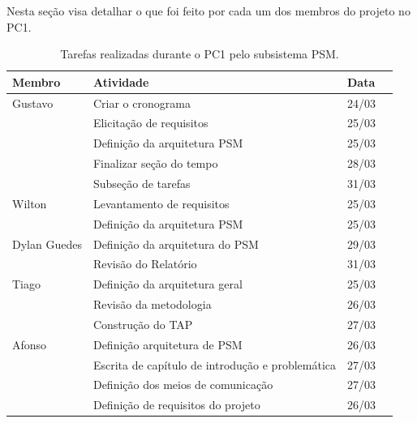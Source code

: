 Nesta seção visa detalhar o que foi feito por cada um dos membros do projeto no PC1.

\begin{table}[h]
  \begin{center}
  \caption{\label{tarefas}Tarefas realizadas durante o PC1 pelo subsistema PSM.}
  \begin{tabular}{|l|l|l|l|}
  \hline
  \textbf{Membro} & \textbf{Atividade} & \textbf{Data} \\ \hline\hline
  Gustavo & Criar o cronograma & 24/03 \\ \hline
   & Elicitação de requisitos & 25/03 \\ \hline
   & Definição da arquitetura PSM & 25/03 \\ \hline
   & Finalizar seção do tempo & 28/03 \\ \hline
   & Subseção de tarefas & 31/03\\ \hline
  Wilton & Levantamento de requisitos & 25/03 \\ \hline
   & Definição da arquitetura PSM & 25/03 \\ \hline
  Dylan Guedes & Definição da arquitetura do PSM & 29/03\\ \hline
   & Revisão do Relatório & 31/03 \\ \hline
  Tiago & Definição da arquitetura geral & 25/03 \\ \hline
   & Revisão da metodologia & 26/03 \\ \hline
   & Construção do TAP & 27/03 \\ \hline
  Afonso & Definição arquitetura de PSM & 26/03 \\ \hline
   & Escrita de capítulo de introdução e problemática & 27/03 \\ \hline
   & Definição dos meios de comunicação & 27/03 \\ \hline
   & Definição de requisitos do projeto & 26/03 \\ \hline
  \end{tabular}
  \end{center}
\end{table}

